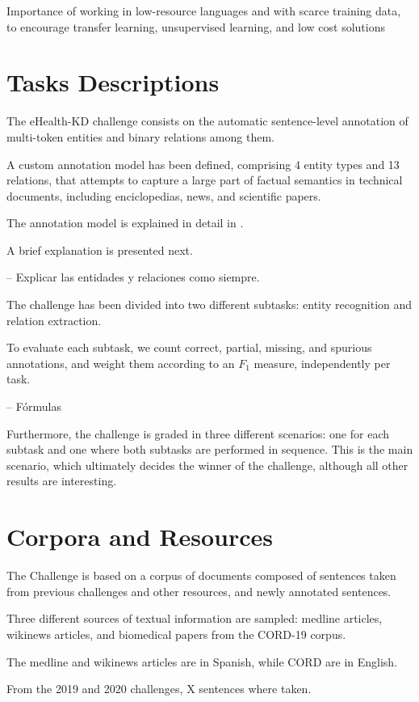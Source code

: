 \documentclass[a4paper,11pt,twocolumn,twoside]{article}
\begin{document}
Importance of working in low-resource languages and with scarce training data,
to encourage transfer learning, unsupervised learning, and low cost solutions

\section{Tasks Descriptions}

The eHealth-KD challenge consists on the automatic sentence-level annotation
of multi-token entities and binary relations among them.

A custom annotation model has been defined, comprising 4 entity types and 13 relations,
that attempts to capture a large part of factual semantics in technical documents,
including enciclopedias, news, and scientific papers.

The annotation model is explained in detail in .

A brief explanation is presented next.

-- Explicar las entidades y relaciones como siempre.

The challenge has been divided into two different subtasks:
entity recognition and relation extraction.

To evaluate each subtask, we count correct, partial, missing, and spurious
annotations, and weight them according to an $F_1$ measure, independently per task.

-- Fórmulas

Furthermore, the challenge is graded in three different scenarios:
one for each subtask and one where both subtasks are performed in sequence.
This is the main scenario, which ultimately decides the winner of the challenge,
although all other results are interesting.

\section{Corpora and Resources}

The Challenge is based on a corpus of documents composed of
sentences taken from previous challenges and other resources,
and newly annotated sentences.

Three different sources of textual information are sampled: medline articles,
wikinews articles, and biomedical papers from the CORD-19 corpus.

The medline and wikinews articles are in Spanish, while CORD are in English.

From the 2019 and 2020 challenges, X sentences where taken.
\end{document}
